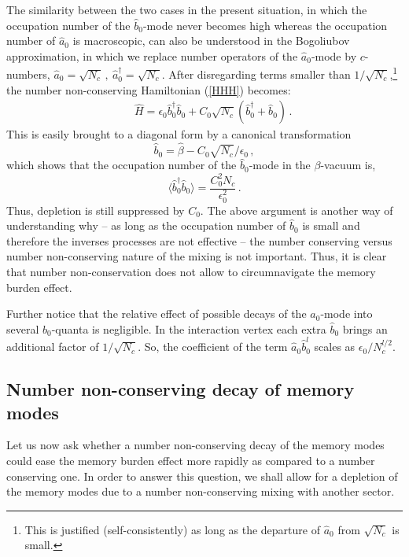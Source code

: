 \documentclass[aps,prd,reprint,superscriptaddress,nofootinbib]{revtex4-2}
\begin{document}
 The similarity between the two cases in the present situation, 
in which the occupation number of the $\hat{b}_0$-mode never becomes high 
whereas the occupation number of $\hat{a}_0$ is macroscopic, can also be understood in the Bogoliubov
approximation, in which we replace number operators of the 
$\hat{a}_0$-mode by $c$-numbers, $\hat{a}_0 = \sqrt{N_c}\,,~  
\hat{a}_0^{\dagger} = \sqrt{N_c}$. After disregarding terms 
smaller than $1/\sqrt{N_c}$,\footnote{
This is justified (self-consistently) as long as the departure of $\hat{a}_0$ from $\sqrt{N_c}$ is small.
}
 the number non-conserving Hamiltonian
(\ref{HHH}) becomes:
\begin{eqnarray}  \label{HNONB} 
&&\hat{H}  = 
\epsilon_0 \hat{b}^{\dagger}_0 \hat{b}_0  + 
C_0 \sqrt{N_c}(\hat{b}_0^{\dagger} + \hat{b}_0)\,.  
\end{eqnarray}
This is easily brought to a diagonal form by a canonical transformation 
\begin{equation}  
\hat{b}_0 =  \hat{\beta} - C_0 \sqrt{N_c}/\epsilon_0 \,,   
\end{equation} 
which shows that the occupation number of the $\hat{b}_0$-mode 
in the $\beta$-vacuum is, 
\begin{equation}
\langle \hat{b}_0^{\dagger} \hat{b}_0 \rangle =  
\frac{C_0^2 N_c}{\epsilon_0^2} \,.  
\end{equation}  
Thus, depletion is still suppressed by $C_0$. The above argument is another way of understanding why -- as long as  the occupation number of 
$\hat{b}_0$ is small and therefore the inverses processes are not effective --  
the number conserving versus number non-conserving 
nature of the mixing is not important.
Thus, it is clear that number non-conservation does not allow to circumnavigate the memory burden effect.

Further notice that the relative effect of possible 
decays of the $\hat{a}_0$-mode into several $\hat{b}_0$-quanta is 
negligible. In the interaction vertex each extra $\hat{b}_0$ brings an additional factor of
$1/\sqrt{N_c}$. So, the coefficient of the term 
$\hat{a}_0\hat{b}_0^{l}$ scales as $\epsilon_0/N_c^{l/2}$.   

\subsection{Number non-conserving decay of memory modes} 

Let us now ask whether 
a number non-conserving decay  of the memory modes 
could ease the memory burden effect more rapidly
as compared to a number conserving one.  
In order to answer this question, we shall  allow  for a depletion of the 
memory modes 
due to a number non-conserving mixing with another sector. 
\end{document}
